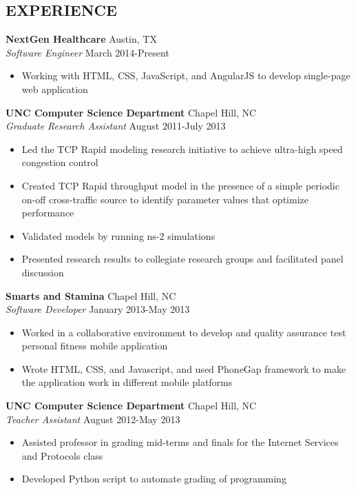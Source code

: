 \documentclass[line,margin,letterpaper]{res}
\begin{document}
\begin{resume}
\section{EXPERIENCE}
  {\bf NextGen Healthcare} \hfill Austin, TX \\
  \emph{Software Engineer} \hfill March 2014-Present
  \begin{itemize} \itemsep -2pt
    \item Working with HTML, CSS, JavaScript, and AngularJS to develop 
    single-page web application
  \end{itemize}
  {\bf UNC Computer Science Department} \hfill Chapel Hill, NC \\
  \emph{Graduate Research Assistant} \hfill August 2011-July 2013
  \begin{itemize} \itemsep -2pt
    \item Led the TCP Rapid modeling research initiative to achieve 
    ultra-high speed congestion control
    \item Created TCP Rapid throughput model in the presence of a simple 
    periodic on-off cross-traffic source to identify parameter values that 
    optimize performance
    \item Validated models by running ns-2 simulations
    \item Presented research results to collegiate research groups and 
    facilitated panel discussion
  \end{itemize}
  {\bf Smarts and Stamina} \hfill Chapel Hill, NC \\
  \emph{Software Developer} \hfill January 2013-May 2013
  \begin{itemize} \itemsep -2pt
    \item Worked in a collaborative environment to develop and quality 
    assurance test personal fitness mobile application
    \item Wrote HTML, CSS, and Javascript, and used PhoneGap framework to make 
    the application work in different mobile platforms
  \end{itemize}
  {\bf UNC Computer Science Department} 
  \hfill Chapel Hill, NC \\
  \emph{Teacher Assistant} \hfill August 2012-May 2013
  \begin{itemize} \itemsep -2pt
    \item Assisted professor in grading mid-terms and finals for the Internet 
    Services and Protocols class
    \item Developed Python script to automate grading of programming 

\end{itemize}
\end{resume}
\end{document}
